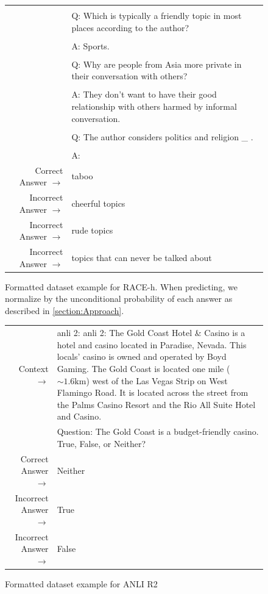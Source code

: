 \begin{figure}[!h]
{\begin{tabularx}{\linewidth}{r X}
 &  \\ 
 & Q: Which is typically a friendly topic in most places according to the author? \\ 
 &  \\ 
 & A: Sports. \\ 
 &  \\ 
 & Q: Why are people from Asia more private in their conversation with others? \\ 
 &  \\ 
 & A: They don't want to have their good relationship with others harmed by informal conversation. \\ 
 &  \\ 
 & Q: The author considers politics and religion   \_  . \\ 
 &  \\ 
 & A: \\ 
 \midrule Correct Answer $\to$ & taboo \\ 
 Incorrect Answer $\to$ & cheerful topics \\ 
 Incorrect Answer $\to$ & rude topics \\ 
 Incorrect Answer $\to$ & topics that can never be talked about\\ \bottomrule \end{tabularx} }  \caption{Formatted dataset example for RACE-h. When predicting, we normalize by the unconditional probability of each answer as described in \ref{section:Approach}.}  \label{eval:RACE-h}  \end{figure}%
\begin{figure} { \tt \footnotesize \begin{tabularx}{\linewidth}{r X} \toprule Context $\to$ & anli 2: anli 2: The Gold Coast Hotel \& Casino is a hotel and casino located in Paradise, Nevada. This locals' casino is owned and operated by Boyd Gaming. The Gold Coast is located one mile ($\sim1.6\mathrm{km}$) west of the Las Vegas Strip on West Flamingo Road. It is located across the street from the Palms Casino Resort and the Rio All Suite Hotel and Casino. \\
 & Question: The Gold Coast is a budget-friendly casino. True, False, or Neither? \\ 
 \midrule Correct Answer $\to$ & Neither \\ 
 Incorrect Answer $\to$ & True \\ 
 Incorrect Answer $\to$ & False\\ \bottomrule \end{tabularx} }  \caption{Formatted dataset example for ANLI R2}  \label{eval:ANLI R2}  \end{figure}%
